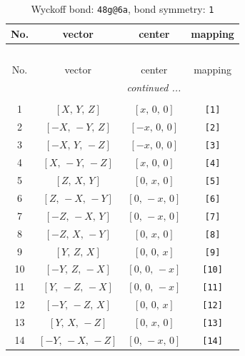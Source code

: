 \documentclass[fleqn,8pt]{jsarticle}
\begin{document}
\begin{longtable}{cccc}
\caption{Wyckoff bond: {\tt 48g@6a}, bond symmetry: {\tt 1}}
 \\
 \hline \hline
No. & vector & center & mapping \\ \hline \endfirsthead

\multicolumn{3}{l}{\tablename\ \thetable{}} \\
 \hline \hline
No. & vector & center & mapping \\ \hline \endhead

 \hline \hline
\multicolumn{3}{r}{\footnotesize\it continued ...} \\ \endfoot

 \hline \hline
\multicolumn{3}{r}{} \\ \endlastfoot

1 & $\left[ X,\, Y,\, Z \right]$ & $\left[ x,\, 0,\, 0 \right]$ & {\tt [1]} \\ \hline
2 & $\left[ - X,\, - Y,\, Z \right]$ & $\left[ - x,\, 0,\, 0 \right]$ & {\tt [2]} \\ \hline
3 & $\left[ - X,\, Y,\, - Z \right]$ & $\left[ - x,\, 0,\, 0 \right]$ & {\tt [3]} \\ \hline
4 & $\left[ X,\, - Y,\, - Z \right]$ & $\left[ x,\, 0,\, 0 \right]$ & {\tt [4]} \\ \hline
5 & $\left[ Z,\, X,\, Y \right]$ & $\left[ 0,\, x,\, 0 \right]$ & {\tt [5]} \\ \hline
6 & $\left[ Z,\, - X,\, - Y \right]$ & $\left[ 0,\, - x,\, 0 \right]$ & {\tt [6]} \\ \hline
7 & $\left[ - Z,\, - X,\, Y \right]$ & $\left[ 0,\, - x,\, 0 \right]$ & {\tt [7]} \\ \hline
8 & $\left[ - Z,\, X,\, - Y \right]$ & $\left[ 0,\, x,\, 0 \right]$ & {\tt [8]} \\ \hline
9 & $\left[ Y,\, Z,\, X \right]$ & $\left[ 0,\, 0,\, x \right]$ & {\tt [9]} \\ \hline
10 & $\left[ - Y,\, Z,\, - X \right]$ & $\left[ 0,\, 0,\, - x \right]$ & {\tt [10]} \\ \hline
11 & $\left[ Y,\, - Z,\, - X \right]$ & $\left[ 0,\, 0,\, - x \right]$ & {\tt [11]} \\ \hline
12 & $\left[ - Y,\, - Z,\, X \right]$ & $\left[ 0,\, 0,\, x \right]$ & {\tt [12]} \\ \hline
13 & $\left[ Y,\, X,\, - Z \right]$ & $\left[ 0,\, x,\, 0 \right]$ & {\tt [13]} \\ \hline
14 & $\left[ - Y,\, - X,\, - Z \right]$ & $\left[ 0,\, - x,\, 0 \right]$ & {\tt [14]} \\ \hline

\end{longtable}
\end{document}
